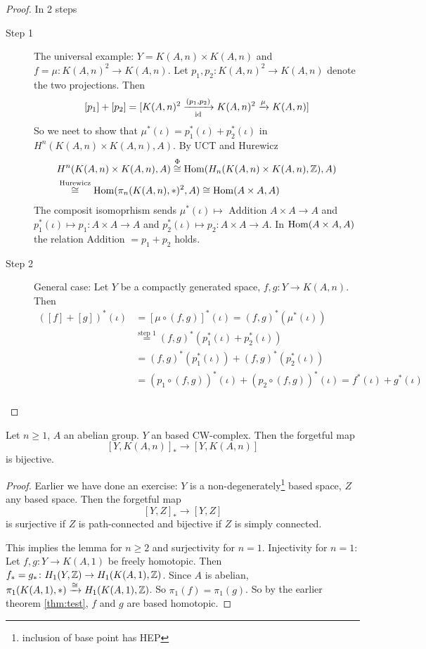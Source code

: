\documentclass[language=english]{TemplateLecture}
\begin{document}
\begin{proof}
    In 2 steps
    \begin{description}
        \item[Step 1] The universal example: \(Y = K(A,n)\times K(A,n)\) and \(f = \mu\colon K(A,n)^2\to K(A,n)\). Let \(p_1, p_2\colon K(A,n)^2\to K(A,n)\) denote the two projections. Then
        \[[p_1] + [p_2] = [K(A,n)^2 \xrightarrow[\operatorname{id}]{(p_1, p_2)} K(A,n)^2\xrightarrow{\mu} K(A,n)]\]
        So we neet to show that \(\mu^*(\iota)= p_1^*(\iota) + p_2^*(\iota)\) in \(H^n(K(A,n)\times K(A,n), A)\). By UCT and Hurewicz
        \[\begin{split}
            &H^n(K(A,n)\times K(A,n), A)\overset{\Phi}{\cong} \operatorname{Hom}(H_n(K(A,n)\times K(A,n),\mathbb{Z}), A) \\
            &\overset{\text{Hurewicz}}{\cong } \operatorname{Hom}(\pi_n(K(A,n), *)^2, A) \cong \operatorname{Hom}(A\times A, A)
        \end{split}\]
        The composit isomoprhism sends \(\mu^*(\iota)\mapsto \text{ Addition } A\times A\to A\) and \(p_1^*(\iota) \mapsto p_1\colon A\times A\to A\) and \(p_2^*(\iota)\mapsto p_2\colon A\times A\to A\). In \(\operatorname{Hom}(A\times A, A)\) the relation \(\text{Addition } = p_1 + p_2\) holds.
        \item[Step 2] General case: Let \(Y\) be a compactly generated space, \(f, g \colon Y\to K(A,n)\). Then
        \[\begin{split}
            ([f]+ [g])^*(\iota) &= [\mu\circ (f,g)]^*(\iota) = (f,g)^*(\mu^*(\iota)) \\
            &\overset{\text{step }1}{=} (f,g)^*(p_1^*(\iota) + p_2^*(\iota)) \\
            &= (f,g)^*(p_1^*(\iota)) + (f,g)^*(p_2^*(\iota)) \\
            &= (p_1\circ (f,g))^*(\iota) + (p_2\circ (f,g))^*(\iota) = f^*(\iota) + g^*(\iota) \\ 
        \end{split}\]
    \end{description}
\end{proof}

\begin{lem}{}{}
    Let \(n\geq 1\), \(A\) an abelian group. \(Y\) an based CW-complex. Then the forgetful map
    \[[Y, K(A,n)]_*\to [Y, K(A,n)]\]
    is bijective.
\end{lem}

\begin{proof}
    Earlier we have done an exercise: \(Y\) is a non-degenerately\footnote{inclusion of base point has HEP} based space, \(Z\) any based space. Then the forgetful map
    \[[Y,Z]_* \to [Y, Z]\]
    is surjective if \(Z\) is path-connected and bijective if \(Z\) is simply connected.

    This implies the lemma for \(n\geq 2\) and surjectivity for \(n = 1\). Injectivity for \(n=1\): Let \(f,g \colon Y\to K(A,1)\) be freely homotopic. Then \(f_* = g_*\colon H_1(Y,\mathbb{Z})\to H_1(K(A,1),\mathbb{Z})\). Since \(A\) is abelian, \(\pi_1(K(A,1), *)\xrightarrow{\cong} H_1(K(A,1),\mathbb{Z})\). So \(\pi_1(f) = \pi_1(g)\). So by the earlier theorem \ref{thm:test}, \(f\) and \(g\) are based homotopic.
\end{proof}
\end{document}
